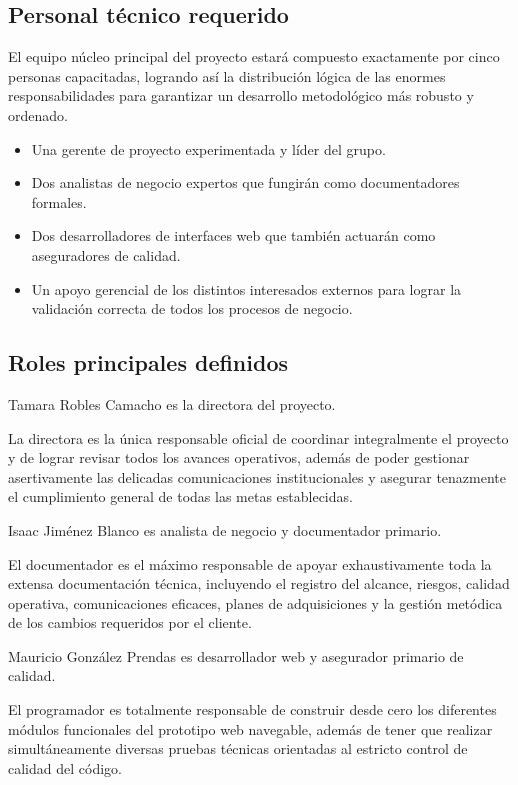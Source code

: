 \documentclass[11pt,spanish]{article}
\begin{document}
\subsection{Personal técnico requerido}

El equipo núcleo principal del proyecto estará compuesto exactamente por cinco personas capacitadas, logrando así la distribución lógica de las enormes responsabilidades para garantizar un desarrollo metodológico más robusto y ordenado.

\begin{itemize}
    \item Una gerente de proyecto experimentada y líder del grupo.
    \item Dos analistas de negocio expertos que fungirán como documentadores formales.
    \item Dos desarrolladores de interfaces web que también actuarán como aseguradores de calidad.
    \item Un apoyo gerencial de los distintos interesados externos para lograr la validación correcta de todos los procesos de negocio.
\end{itemize}

\subsection{Roles principales definidos}

Tamara Robles Camacho es la directora del proyecto.

La directora es la única responsable oficial de coordinar integralmente el proyecto y de lograr revisar todos los avances operativos, además de poder gestionar asertivamente las delicadas comunicaciones institucionales y asegurar tenazmente el cumplimiento general de todas las metas establecidas.

Isaac Jiménez Blanco es analista de negocio y documentador primario.

El documentador es el máximo responsable de apoyar exhaustivamente toda la extensa documentación técnica, incluyendo el registro del alcance, riesgos, calidad operativa, comunicaciones eficaces, planes de adquisiciones y la gestión metódica de los cambios requeridos por el cliente.

Mauricio González Prendas es desarrollador web y asegurador primario de calidad.

El programador es totalmente responsable de construir desde cero los diferentes módulos funcionales del prototipo web navegable, además de tener que realizar simultáneamente diversas pruebas técnicas orientadas al estricto control de calidad del código.
\end{document}
